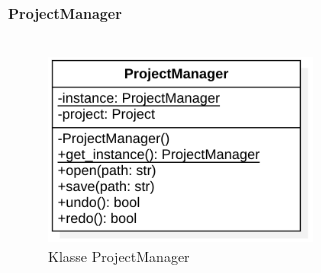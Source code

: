 \documentclass{article}
\begin{document}
\newpage
\textbf{\large{ProjectManager}}\\\\

\begin{figure}[H]%
    \centering
    \includegraphics[width=7cm]{entwurf/Floriane/ProjectManager.png}
    \caption{Klasse ProjectManager}
\end{figure}
\end{document}
